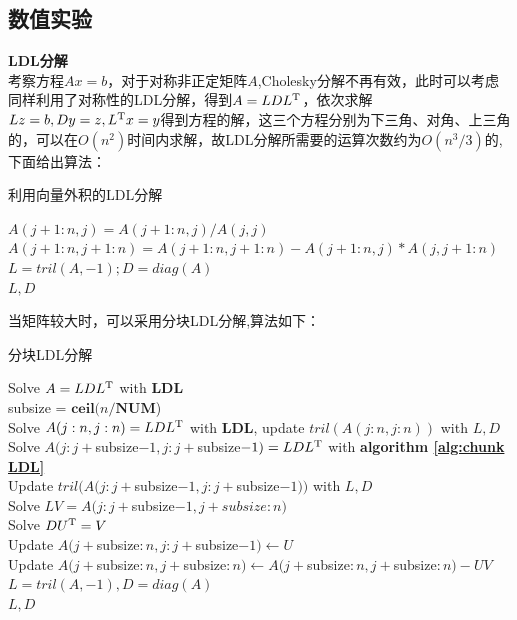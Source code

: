 \documentclass[12pt]{ctexart}
\begin{document}
\subsection{数值实验}
\noindent \textbf{LDL分解}\\
考察方程$Ax=b$，对于对称非正定矩阵$A$,Cholesky分解不再有效，此时可以考虑同样利用了对称性的LDL分解，得到$A=LDL^{\rm T}$，依次求解$Lz=b,Dy=z,L^{\rm T} x=y$得到方程的解，这三个方程分别为下三角、对角、上三角的，可以在$O(n^2)$时间内求解，故LDL分解所需要的运算次数约为$O(n^3/3)$的,下面给出算法：\\
\begin{algorithm}[H]
	\caption{利用向量外积的LDL分解}  
	\label{alg:gaxpy ldl}
	{ 
		$A(j+1:n,j) = A(j+1:n,j)/A(j,j)$\\
		$A(j+1:n,j+1:n) = A(j+1:n,j+1:n)-A(j+1:n,j)*A(j,j+1:n)$\\	
	}  
	$L = tril(A,-1); D = diag(A)$\\
	\Return $L,D$\;
\end{algorithm}
当矩阵较大时，可以采用分块LDL分解,算法如下：\\
\begin{algorithm}[H]
	\caption{分块LDL分解}  
	\label{alg:chunk LDL}
	{
			Solve $A=LDL^{\rm T}$ with  \textbf{LDL}\\
	}  
	subsize = $\textbf{ceil}(n/\textbf{NUM}$)\\
	{ 
		{
			Solve $ A(j:n,j:n) = LDL^{\rm T} $ with \textbf{LDL}, update $ tril(A(j:n,j:n))$ with $ L,D$\\
		}
		\Else
		{
			Solve $A(j:j+$subsize$-1,j:j+$subsize$-1) = LDL^{\rm T}$ with \textbf{algorithm \ref{alg:chunk LDL}}\\
			Update $tril(A(j:j+$subsize$-1,j:j+$subsize$-1)) $ with $ L,D$\\
			Solve $ LV= A(j:j+$subsize$-1,j+subsize:n) $\\
			Solve $ DU^{\rm T} = V $\\
			Update $A(j+$subsize$:n,j:j+$subsize$-1)\gets U $\\
			Update $A(j+$subsize$:n,j+$subsize$:n)\gets A(j+$subsize$:n,j+$subsize$:n)-UV$\\						
		}	
	} 
 	$L = tril(A,-1),D=diag(A)$\\
	\Return $L,D$\;
\end{algorithm}
\end{document}
